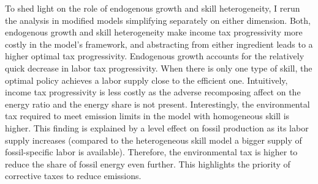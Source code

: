 


To shed light on the role of endogenous growth and skill heterogeneity, I rerun the analysis in modified models simplifying separately on either dimension. 
Both, endogenous growth and skill heterogeneity make income tax progressivity more costly in the model's framework, and abstracting from either ingredient leads to a higher optimal tax progressivity. 
Endogenous growth accounts for the relatively quick decrease in labor tax progressivity. When there is only one type of skill, the optimal policy achieves a labor supply close to the efficient one. Intuitively, income tax progressivity is less costly as the adverse recomposing affect on the energy ratio and the energy share is not present.
Interestingly, the environmental tax required to meet emission limits in the model with homogeneous skill is higher. This finding is explained by a level effect on fossil production as its labor supply increases (compared to the heterogeneous skill model a bigger supply of fossil-specific labor is available). Therefore, the environmental tax is higher to reduce the share of fossil energy even further. This highlights the priority of corrective taxes to reduce emissions. 



